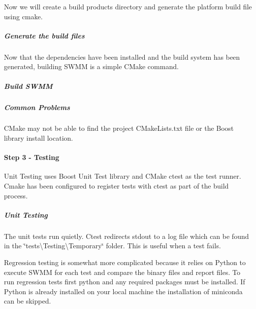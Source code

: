 Now we will create a build products directory and generate the platform build file using cmake.

\subparagraph*{Generate the build files}


\begin{DoxyCode}{0}
\end{DoxyCode}


Now that the dependencies have been installed and the build system has been generated, building S\+W\+MM is a simple C\+Make command.

\subparagraph*{Build S\+W\+MM}


\begin{DoxyCode}{0}
\end{DoxyCode}


\subparagraph*{Common Problems}

C\+Make may not be able to find the project C\+Make\+Lists.\+txt file or the Boost library install location.

\paragraph*{Step 3 -\/ Testing}

Unit Testing uses Boost Unit Test library and C\+Make ctest as the test runner. Cmake has been configured to register tests with ctest as part of the build process.

\subparagraph*{Unit Testing}


\begin{DoxyCode}{0}
\end{DoxyCode}


The unit tests run quietly. Ctest redirects stdout to a log file which can be found in the \char`\"{}tests\textbackslash{}\+Testing\textbackslash{}\+Temporary\char`\"{} folder. This is useful when a test fails.

Regression testing is somewhat more complicated because it relies on Python to execute S\+W\+MM for each test and compare the binary files and report files. To run regression tests first python and any required packages must be installed. If Python is already installed on your local machine the installation of miniconda can be skipped.

